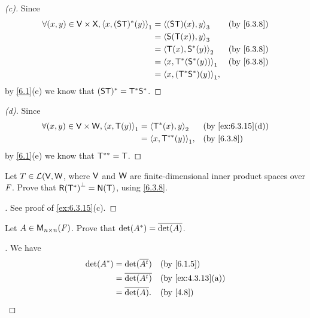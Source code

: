 \begin{proof}[(c)]
	Since
	\begin{align*}
		\forall (x, y) \in \V \times \vs{X}, \inn{x, (\lt{S} \T)^*(y)}_1 & = \inn{(\lt{S} \T)(x), y}_3      &  & \by{6.3.8} \\
		                                                                 & = \inn{\lt{S}(\T(x)), y}_3                       \\
		                                                                 & = \inn{\T(x), \lt{S}^*(y)}_2     &  & \by{6.3.8} \\
		                                                                 & = \inn{x, \T^*(\lt{S}^*(y))}_1   &  & \by{6.3.8} \\
		                                                                 & = \inn{x, (\T^* \lt{S}^*)(y)}_1,
	\end{align*}
	by \cref{6.1}(e) we know that \((\mathsf{S} \mathsf{T})^* = \mathsf{T}^* \mathsf{S}^*\).
\end{proof}

\begin{proof}[(d)]
	Since
	\begin{align*}
		\forall (x, y) \in \V \times \W, \inn{x, \T(y)}_1 & = \inn{\T^*(x), y}_2     &  & \by{ex:6.3.15}[d] \\
		                                                  & = \inn{x, \T^{**}(y)}_1, &  & \by{6.3.8}
	\end{align*}
	by \cref{6.1}(e) we know that \(\mathsf{T}^{**} = \mathsf{T}\).
\end{proof}

\begin{ex}\label{ex:6.3.17}
	Let \(T \in \mathcal{L}(\mathsf{V}, \mathsf{W}\), where \(\mathsf{V}\) and \(\mathsf{W}\) are finite-dimensional inner product spaces over \(\mathit{F}\).
	Prove that \(\rg{\T^*}^{\perp} = \ns{\T}\), using \cref{6.3.8}.
\end{ex}

\begin{proof}[]
	See proof of \cref{ex:6.3.15}(c).
\end{proof}

\begin{ex}\label{ex:6.3.18}
	Let \(A \in \ms[n][n][\F]\).
	Prove that \(\det(A^*) = \overline{\det(A)}\).
\end{ex}

\begin{proof}[]
	We have
	\begin{align*}
		\det(A^*) & = \det(\conj{\tp{A}}) &  & \by{6.1.5}        \\
		          & = \conj{\det(\tp{A})} &  & \by{ex:4.3.13}[a] \\
		          & = \conj{\det(A)}.     &  & \by{4.8}
	\end{align*}
\end{proof}

